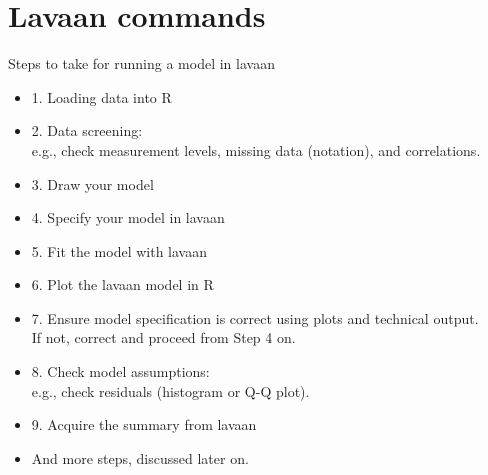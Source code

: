 \documentclass[10pt]{beamer}\usepackage[]{graphicx}\usepackage[]{xcolor}
\makeatletter
\newcommand{\hlnum}[1]{\textcolor[rgb]{0.686,0.059,0.569}{#1}}%
\newcommand{\hlstr}[1]{\textcolor[rgb]{0.192,0.494,0.8}{#1}}%
\newcommand{\hlopt}[1]{\textcolor[rgb]{0,0,0}{#1}}%
\newcommand{\hlstd}[1]{\textcolor[rgb]{0.345,0.345,0.345}{#1}}%
\newcommand{\hlkwa}[1]{\textcolor[rgb]{0.161,0.373,0.58}{\textbf{#1}}}%
\newcommand{\hlkwb}[1]{\textcolor[rgb]{0.69,0.353,0.396}{#1}}%
\newcommand{\hlkwc}[1]{\textcolor[rgb]{0.333,0.667,0.333}{#1}}%
\newcommand{\hlkwd}[1]{\textcolor[rgb]{0.737,0.353,0.396}{\textbf{#1}}}%
\newenvironment{kframe}{%
 \def\at@end@of@kframe{}%
 \ifinner\ifhmode%
  \def\at@end@of@kframe{\end{minipage}}%
  \begin{minipage}{\columnwidth}%
 \fi\fi%
 \def\FrameCommand##1{\hskip\@totalleftmargin \hskip-\fboxsep
 \colorbox{shadecolor}{##1}\hskip-\fboxsep
     \hskip-\linewidth \hskip-\@totalleftmargin \hskip\columnwidth}%
 \MakeFramed {\advance\hsize-\width
   \@totalleftmargin\z@ \linewidth\hsize
   \@setminipage}}%
 {\par\unskip\endMakeFramed%
 \at@end@of@kframe}
\newenvironment{knitrout}{}{} %
\makeatother
\begin{document}
\section{Lavaan commands}
%
%
\begin{frame}{Steps to take for running a model in lavaan}

\begin{itemize}
\item{1. Loading data into R}
\item{2. Data screening: \\
e.g., check measurement levels, missing data (notation),
and correlations.}
\item{3. Draw your model}
\item{4. Specify your model in lavaan}
\item{5. Fit the model with lavaan}
\item{6. Plot the lavaan model in R}
\item{7. Ensure model specification is correct
using plots and technical output.\\
If not, correct and proceed from Step 4 on.}
\item{8. Check model assumptions: \\
e.g., check residuals (histogram or Q-Q plot).}
\item{9. Acquire the summary from lavaan}
\item{And more steps, discussed later on.}
\end{itemize}

\end{frame}
\end{document}
